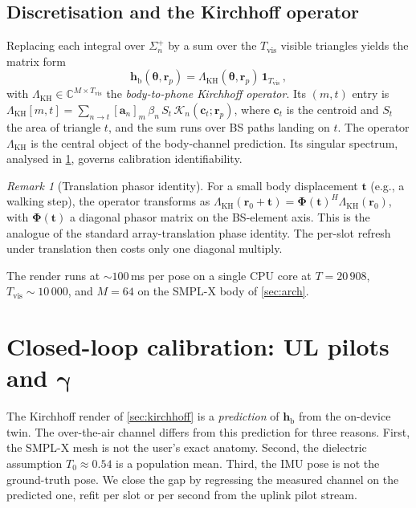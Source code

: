 \documentclass[journal,twocolumn,10pt]{IEEEtran}
\theoremstyle{plain}
\theoremstyle{definition}
\theoremstyle{remark}
\newtheorem{remark}[theorem]{Remark}
\newcommand{\rr}{\mathbf{r}}
\newcommand{\Phimat}{\mathbf{\Phi}}
\newcommand{\thetab}{\bm{\theta}}
\newcommand{\gammab}{\bm{\gamma}}
\newcommand{\hbody}{\bm{h}_{\mathrm{b}}}
\newcommand{\Tepskin}{T_{0}}
\newcommand{\Complex}{\mathbb{C}}
\begin{document}
\subsection{Discretisation and the Kirchhoff operator}

Replacing each integral over $\Sigma_n^{+}$ by a sum over the
$T_{\mathrm{vis}}$ visible triangles yields the matrix form
\begin{equation}\label{eq:Lambda-op}
\hbody(\thetab,\rr_p) = \Lambda_{\mathrm{KH}}(\thetab,\rr_p)\,
\bm{1}_{T_{\mathrm{vis}}} \,,
\end{equation}
with $\Lambda_{\mathrm{KH}} \in \Complex^{M \times T_{\mathrm{vis}}}$
the \emph{body-to-phone Kirchhoff operator}. Its $(m,t)$ entry is
$\Lambda_{\mathrm{KH}}[m,t] = \sum_{n \to t} [\bm{a}_n]_m \,
\beta_n\, S_t\, \mathcal{K}_n(\bm{c}_t;\rr_p)$, where $\bm{c}_t$
is the centroid and $S_t$ the area of triangle $t$, and the sum
runs over BS paths landing on $t$. The operator
$\Lambda_{\mathrm{KH}}$ is the central object of the body-channel
prediction. Its singular spectrum, analysed in
\cref{sec:closed-loop}, governs calibration identifiability.

\begin{remark}[Translation phasor identity]
For a small body displacement $\bm{t}$ (e.g., a walking step), the
operator transforms as $\Lambda_{\mathrm{KH}}(\rr_0 + \bm{t}) =
\Phimat(\bm{t})^{H}\Lambda_{\mathrm{KH}}(\rr_0)$, with $\Phimat(\bm{t})$
a diagonal phasor matrix on the BS-element axis. This is the analogue
of the standard array-translation phase identity. The per-slot
refresh under translation then costs only one diagonal multiply.
\end{remark}

The render runs at $\sim\!100\,$ms per pose on a single CPU core
at $T = 20\,908$, $T_{\mathrm{vis}} \sim 10\,000$, and $M = 64$ on
the SMPL-X body of \cref{sec:arch}.


\section{Closed-loop calibration: UL pilots and \texorpdfstring{$\gammab$}{gamma}}\label{sec:closed-loop}

The Kirchhoff render of \cref{sec:kirchhoff} is a \emph{prediction}
of $\hbody$ from the on-device twin. The over-the-air channel
differs from this prediction for three reasons. First, the SMPL-X
mesh is not the user's exact anatomy. Second, the dielectric
assumption $\Tepskin\approx 0.54$ is a population mean. Third, the
IMU pose is not the ground-truth pose. We close the gap by
regressing the measured channel on the predicted one, refit per
slot or per second from the uplink pilot stream.
\end{document}
